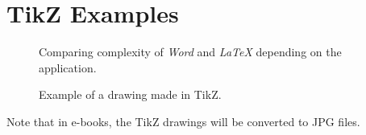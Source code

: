 

\chapter{TikZ Examples}\label{tikz-examples:cha}

\begin{figure}
\centering

\caption{Comparing complexity of \textit{Word} and \textit{LaTeX} depending on the application.}
\end{figure}

\begin{figure}
\centering

\caption{Example of a drawing made in TikZ.}
\end{figure}

Note that in e-books, the TikZ drawings will be converted to JPG files.